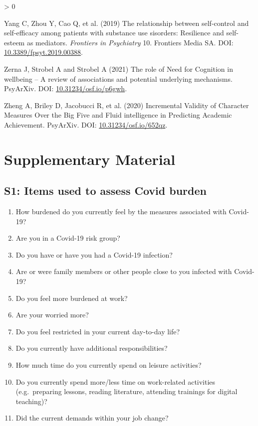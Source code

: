 \documentclass[
  english,
  man,floatsintext]{apa6}
\newlength{\cslhangindent}
\newenvironment{CSLReferences}[2] %
 {%
  \setlength{\parindent}{0pt}
  \ifodd #1 \everypar{\setlength{\hangindent}{\cslhangindent}}\ignorespaces\fi
  \ifnum #2 > 0
  \setlength{\parskip}{#2\baselineskip}
  \fi
 }%
 {}
\begin{document}
\begin{CSLReferences}{1}{0}
\leavevmode\hypertarget{ref-Yang2019}{}%
Yang C, Zhou Y, Cao Q, et al. (2019) The relationship between self-control and self-efficacy among patients with substance use sisorders: {R}esilience and self-esteem as mediators. \emph{Frontiers in Psychiatry} 10. Frontiers Media {SA}. DOI: \href{https://doi.org/10.3389/fpsyt.2019.00388}{10.3389/fpsyt.2019.00388}.

\leavevmode\hypertarget{ref-Zerna2021}{}%
Zerna J, Strobel A and Strobel A (2021) The role of {Need} for {Cognition} in wellbeing -- {A} review of associations and potential underlying mechanisms. PsyArXiv. DOI: \href{https://doi.org/10.31234/osf.io/p6gwh}{10.31234/osf.io/p6gwh}.

\leavevmode\hypertarget{ref-Zheng2020}{}%
Zheng A, Briley D, Jacobucci R, et al. (2020) Incremental {Validity} of {Character} {Measures} {Over} the {Big} {Five} and {Fluid} intelligence in {Predicting} {Academic} {Achievement}. PsyArXiv. DOI: \href{https://doi.org/10.31234/osf.io/652qz}{10.31234/osf.io/652qz}.

\end{CSLReferences}

\endgroup

\newpage

\hypertarget{supplementary-material}{%
\section{Supplementary Material}\label{supplementary-material}}

\hypertarget{s1-items-used-to-assess-covid-burden}{%
\subsection{S1: Items used to assess Covid burden}\label{s1-items-used-to-assess-covid-burden}}

\begin{enumerate}
\def\labelenumi{\arabic{enumi}.}
\item
  How burdened do you currently feel by the measures associated with Covid-19?
\item
  Are you in a Covid-19 risk group?
\item
  Do you have or have you had a Covid-19 infection?
\item
  Are or were family members or other people close to you infected with Covid-19?
\item
  Do you feel more burdened at work?
\item
  Are your worried more?
\item
  Do you feel restricted in your current day-to-day life?
\item
  Do you currently have additional responsibilities?
\item
  How much time do you currently spend on leisure activities?
\item
  Do you currently spend more/less time on work-related activities (e.g.~preparing lessons, reading literature, attending trainings for digital teaching)?
\item
  Did the current demands within your job change?
\end{enumerate}
\end{document}
